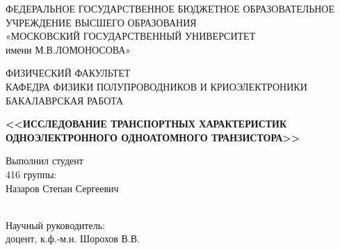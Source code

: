 \documentclass[12pt,a4paper]{report}
\begin{document}
\setlength{\parindent}{1.25cm} 
\sloppy   

\onehalfspacing  
\thispagestyle{empty}
\begin{titlepage}
\begin{center}
ФЕДЕРАЛЬНОЕ ГОСУДАРСТВЕННОЕ БЮДЖЕТНОЕ ОБРАЗОВАТЕЛЬНОЕ
УЧРЕЖДЕНИЕ ВЫСШЕГО ОБРАЗОВАНИЯ \\
«МОСКОВСКИЙ ГОСУДАРСТВЕННЫЙ УНИВЕРСИТЕТ\\
имени М.В.ЛОМОНОСОВА»
\vspace{1cm}

ФИЗИЧЕСКИЙ ФАКУЛЬТЕТ\\
\vspace{1cm}
КАФЕДРА ФИЗИКИ ПОЛУПРОВОДНИКОВ И КРИОЭЛЕКТРОНИКИ\\

\vspace{1cm}
БАКАЛАВРСКАЯ РАБОТА \\
\vspace{1cm}

\textbf{<<ИССЛЕДОВАНИЕ ТРАНСПОРТНЫХ ХАРАКТЕРИСТИК ОДНОЭЛЕКТРОННОГО ОДНОАТОМНОГО ТРАНЗИСТОРА>>}


\end{center}


\begin{flushright}
\vspace{1cm}

Выполнил студент \\
416 группы:\\

Назаров Степан Сергеевич \\

\underline{\hspace{3cm}}\\

\vspace{1cm}

Научный руководитель:\\
доцент, к.ф.\--м.н. Шорохов В.В. \\
\underline{\hspace{3cm}}\\
 

\end{flushright}
\end{titlepage}
\end{document}

